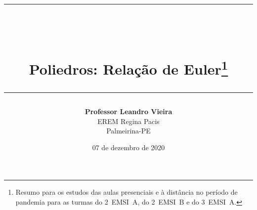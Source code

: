 \usepackage[english,brazilian]{babel}
\usepackage[alf]{abntex2cite}
\usepackage[utf8]{inputenc}
\usepackage[T1]{fontenc}
\usepackage[top=25mm, bottom=25mm, left=25mm, right=25mm]{geometry}
\usepackage{framed}
\usepackage{booktabs}
\usepackage{color}
\usepackage{hyperref}
\usepackage{graphicx}
\usepackage{amsfonts}
\usepackage{subfigure}
\usepackage{enumerate}
\usepackage{float}
\graphicspath{{./Figuras/}}    
\usepackage{cancel}

\usepackage{pgf,tikz}
\usetikzlibrary{arrows}

\usepackage{multicol}
\columnsep=10mm %
\setlength{\columnseprule}{1.25pt}

\usepackage{fancyhdr}
\lhead{\rightmark}
\renewcommand{\footrulewidth}{0.5pt}

\setlength{\parindent}{1.25cm}%

\pagestyle{fancy}
\def\MakeUppercase{} %


\usepackage{amsthm}
\newtheorem{problema}{Problema}
\newtheorem{exercicio}{Exercício}

\usepackage[skip=10pt]{caption}

\newcommand{\LINHAHORIZONTAL}{\center \rule{16cm}{1.25pt}}

\newcommand{\frase}{\flushright{\textit{``Há 2 espécies de chatos: os chatos propriamente ditos\\e os amigos, que são os nossos chatos prediletos.''}}\\\textbf{Mario Quintana}}
\newcommand{\FRASE}{\begin{verse} \frase \end{verse}}

\author{\textbf{Professor Leandro Vieira}\\EREM Regina Pacis\\Palmeirina-PE}
\date{07 de dezembro de 2020}

\title{\LINHAHORIZONTAL \\ \textbf{\\Poliedros: Relação de Euler}\footnote{Resumo para os estudos das aulas presenciais e à distância no período de pandemia para as turmas do 2~EMSI~A, do 2~EMSI~B e do 3~EMSI~A.}\LINHAHORIZONTAL}

\newcommand{\m}[1]{\({#1}\)}
\newcommand{\M}[1]{\[{#1}\]}

\newcommand{\figura}[2]{\begin{figure}[!hbt]\center\texttt{[image: \#1]}\end{figure}}